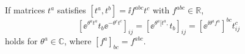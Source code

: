 \documentclass[CheatSheet]{subfiles}
\begin{document}
If matrices $t^a$ satisfies $[t^a,t^b]=\ii f^{abc} t^c$ with $f^{abc}\in\mathbb R$,
\begin{equation}
  \left[\ee^{\theta^at^a} t_b \ee^{-\theta^ct^c}\right]_{ij}
=  \left[\ee^{\theta^a[t^a,}t_b\right]_{ij}
= \left[\ee^{\ii \theta^af^{a}}\right]^{bc} t^c_{ij}
\end{equation}
holds for $\theta^a\in\mathbb C$, where $[f^a]_{bc}=f^{abc}$. 
\end{document}
